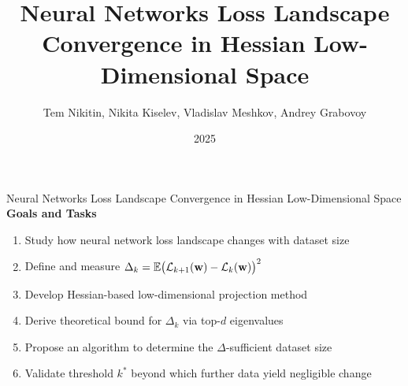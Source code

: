 \documentclass{beamer}
\title[Loss Landscape Convergence]{Neural Networks Loss Landscape Convergence in Hessian Low-Dimensional Space}
\author[Tem Nikitin \textit{et al.}]{Tem Nikitin, Nikita Kiselev, Vladislav Meshkov, Andrey Grabovoy}
\institute{Moscow Institute of Physics and Technology}
\date{2025}
\begin{document}
\begin{frame}
    \thispagestyle{empty}
    \maketitle
\end{frame}

\begin{frame}{Neural Networks Loss Landscape Convergence in Hessian Low-Dimensional Space}
    \textbf{Goals and Tasks}
    \begin{enumerate}
        \item Study how neural network loss landscape changes with dataset size
        \item Define and measure $\Delta_k = \mathbb{E} \bigl( \mathcal{L}_{k+1}(\mathbf{w}) - \mathcal{L}_k(\mathbf{w}) \bigr)^2$
        \item Develop Hessian-based low-dimensional projection method
        \item Derive theoretical bound for $\Delta_k$ via top-$d$ eigenvalues
        \item Propose an algorithm to determine the $\Delta$-sufficient dataset size
        \item Validate threshold $k^*$ beyond which further data yield negligible change
    \end{enumerate}
\end{frame}
\end{document}
